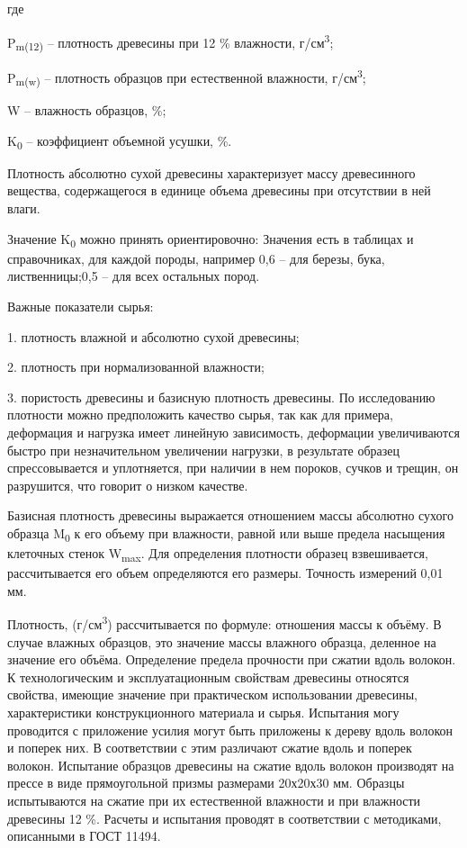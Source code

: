 \begin{multicols}{2}
где

P\textsubscript{m(12)} -- плотность древесины при 12 \% влажности,
г/см\textsuperscript{3};

P\textsubscript{m(w)} -- плотность образцов при естественной влажности,
г/см\textsuperscript{3};

W -- влажность образцов, \%;

K\textsubscript{0} -- коэффициент объемной усушки, \%.

Плотность абсолютно сухой древесины характеризует массу древесинного
вещества, содержащегося в единице объема древесины при отсутствии в ней
влаги.

Значение K\textsubscript{0} можно принять ориентировочно: Значения есть
в таблицах и справочниках, для каждой породы, например 0,6 -- для
березы, бука, лиственницы;0,5 -- для всех остальных пород.

Важные показатели сырья:

1. плотность влажной и абсолютно сухой древесины;

2. плотность при нормализованной влажности;

3. пористость древесины и базисную плотность древесины.
По исследованию плотности можно предположить качество сырья, так как для
примера, деформация и нагрузка имеет линейную зависимость, деформации
увеличиваются быстро при незначительном увеличении нагрузки, в
результате образец спрессовывается и уплотняется, при наличии в нем
пороков, сучков и трещин, он разрушится, что говорит о низком качестве.

Базисная плотность древесины выражается отношением массы абсолютно
сухого образца M\textsubscript{0} к его объему при влажности, равной или
выше предела насыщения клеточных стенок W\textsubscript{max}. Для
определения плотности образец взвешивается, рассчитывается его объем
определяются его размеры. Точность измерений 0,01 мм.

Плотность, (г/см\textsuperscript{3}) рассчитывается по формуле:
отношения массы к объёму. В случае влажных образцов, это значение массы
влажного образца, деленное на значение его объёма. Определение предела
прочности при сжатии вдоль волокон. К технологическим и эксплуатационным
свойствам древесины относятся свойства, имеющие значение при
практическом использовании древесины, характеристики конструкционного
материала и сырья. Испытания могу проводится с приложение усилия могут
быть приложены к дереву вдоль волокон и поперек них. В соответствии с
этим различают сжатие вдоль и поперек волокон. Испытание образцов
древесины на сжатие вдоль волокон производят на прессе в виде
прямоугольной призмы размерами 20х20х30 мм. Образцы испытываются на
сжатие при их естественной влажности и при влажности древесины 12 \%.
Расчеты и испытания проводят в соответствии с методиками, описанными в
ГОСТ 11494.


\end{multicols}

